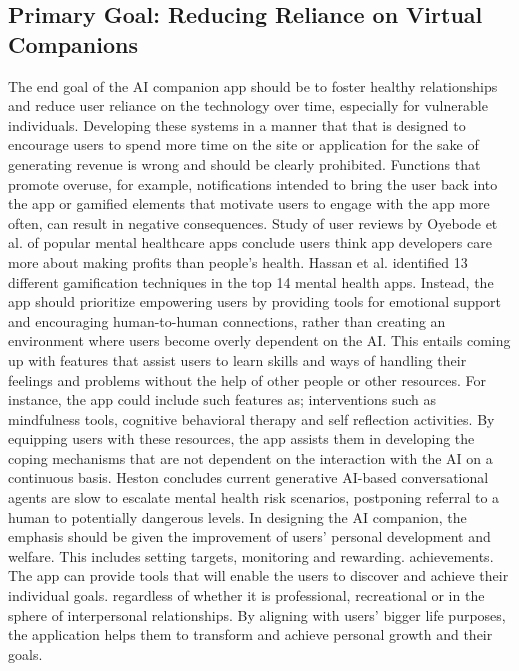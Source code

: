 \subsection{Primary Goal: Reducing Reliance on Virtual Companions}
The end goal of the AI companion app should be to foster healthy relationships and reduce user reliance on the technology over time, especially for vulnerable individuals.  Developing these systems in a manner that that is designed to encourage users to spend more time on the site or application for the sake of generating revenue is wrong and should be clearly prohibited. Functions that promote overuse, for example, notifications intended to bring the user back into the app or gamified elements that motivate users to engage with the app more often, can result in negative consequences. Study of user reviews by Oyebode et al. \cite{oyebode2020using} of popular mental healthcare apps conclude users think app developers care more about making profits than people's health. Hassan et al. \cite{auf2021gamification} identified 13 different gamification techniques in the top 14 mental health apps. Instead, the app should prioritize empowering users by providing tools for emotional support and encouraging human-to-human connections, rather than creating an environment where users become overly dependent on the AI. This entails coming up with features that assist users to learn skills and ways of handling their feelings and problems without the help of other people or other resources. For instance, the app could include such features as; interventions such as mindfulness tools, cognitive behavioral therapy and self reflection activities. By equipping users with these resources, the app assists them in developing the coping mechanisms that are not dependent on the interaction with the AI on a continuous basis. Heston \cite{heston2023safety} concludes current generative AI-based conversational agents are slow to escalate mental health risk scenarios, postponing referral to a human to potentially dangerous levels. In designing the AI companion, the emphasis should be given the improvement of users' personal development and welfare. This includes setting targets, monitoring and rewarding. achievements. The app can provide tools that will enable the users to discover and achieve their individual goals. regardless of whether it is professional, recreational or in the sphere of interpersonal relationships. By aligning with users' bigger life purposes, the application helps them to transform and achieve personal growth and their goals.